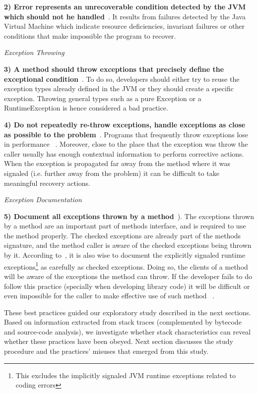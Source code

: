 \documentclass[conference]{IEEEtran}
\begin{document}
\textbf{2) Error represents an unrecoverable condition detected by the JVM which should not he handled}~\cite{gosling2000java}. It results from failures detected by the Java Virtual Machine which indicate resource deficiencies, invariant failures or other conditions that make impossible the program to recover.

\noindent\emph{Exception Throwing}

\textbf{3) A method should throw exceptions that precisely define the exceptional condition}~\cite{gosling2000java,bloch2008effective}. To do so, developers should either try to reuse the exception types already defined in the JVM or they should create a specific exception. Throwing general types such as a pure Exception or a RuntimeException is hence considered a bad practice.

\textbf{4) Do not repeatedly re-throw exceptions, handle exceptions as close as possible to the problem}~\cite{wirfs2006toward}. Programs that frequently throw exceptions lose in performance ~\cite{wirfs2006toward,gosling2000java}. Moreover, close to the place that the exception was throw the caller usually has enough contextual information to perform  corrective actions. When the exception is propagated far away from the method where it was signaled (i.e. further away from the problem) it can be difficult to take meaningful recovery actions.

\noindent\emph{Exception Documentation}

\textbf{5) Document all exceptions thrown by a method}~\cite{mandrioli1992advances,gosling2000java,wirfs2006toward,bloch2008effective}). The exceptions thrown by a method are an important part of methods interface, and is required to use the method properly. The checked exceptions are already part of the  methods signature, and the method caller is aware of the checked exceptions being thrown by it. According to~\cite{bloch2008effective}, it is also wise to document the explicitly signaled runtime exceptions\footnote{This excludes the implicitly signaled JVM runtime exceptions related to coding errors} as carefully as checked exceptions. Doing so, the clients of a method will be aware of the exceptions the method can throw. If the developer fails to do follow this practice (specially when developing library code) it will be difficult or even impossible for the caller to make effective use of such method ~\cite{wirfs2006toward, bloch2008effective}.

These best practices guided our exploratory study described in the next sections. Based on information extracted from stack traces (complemented by bytecode and source-code analysis), we investigate whether stack characteristics can reveal whether these practices have been obeyed. Next section discusses the study procedure and the practices' misuses that emerged from this study.
\end{document}
